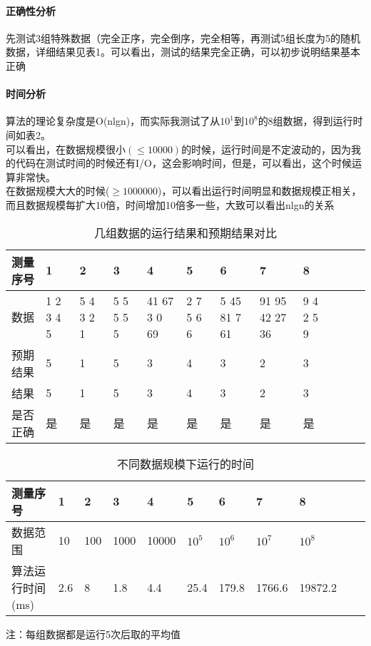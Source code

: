 \documentclass{article}
\begin{document}
\begin{CJK}{UTF8}{gkai}
\paragraph{正确性分析}
先测试3组特殊数据（完全正序，完全倒序，完全相等，再测试5组长度为5的随机数据，详细结果见表1。可以看出，测试的结果完全正确，可以初步说明结果基本正确\\
\paragraph{时间分析}
算法的理论复杂度是O(nlgn)，而实际我测试了从$10^{1}$到$10^{8}$的8组数据，得到运行时间如表2。\\
可以看出，在数据规模很小$(\leq10000)$的时候，运行时间是不定波动的，因为我的代码在测试时间的时候还有I/O，这会影响时间，但是，可以看出，这个时候运算非常快。\\
在数据规模大大的时候($\geq1000000$)，可以看出运行时间明显和数据规模正相关，而且数据规模每扩大10倍，时间增加10倍多一些，大致可以看出nlgn的关系\\
\begin{table}[!htbp] 
	\small
	\caption{几组数据的运行结果和预期结果对比}
	\begin{flushleft} 
		\begin{tabular}{|l|l|l|l|l|l|l|l|l|l|l|l|} 
			\hline 测量序号 & 1 & 2 & 3 & 4 & 5 & 6 & 7 & 8  \\ 
			\hline 数据 &1 2 3 4 5&5 4 3 2 1&5 5 5 5 5&41 67 3 0 69&2 7 5 6 6&5 45 81 7 61&91 95 42 27 36&9 4 2 5 9 \\ 
			\hline 预期结果
			&5&1&5&3&4&3&2&3  \\
			\hline 结果 
			&5&1&5&3&4&3&2&3  \\ 
			\hline 是否正确
			&是&是&是&是&是&是&是&是  \\ 
			\hline
		\end{tabular} 

	\end{flushleft} 
\end{table}

\begin{table}[!htbp] 
	
	\caption{不同数据规模下运行的时间}
	\begin{flushleft} 
		\begin{tabular}{|l|l|l|l|l|l|l|l|l|l|l|} 
			\hline 测量序号 & 1 & 2 & 3 & 4 & 5 & 6 & 7 & 8 \\ 
			\hline 数据范围 &10&100&1000&10000&$10^{5}$&$10^{6}$&$10^7$&$10^{8}$ \\ 
			\hline 算法运行时间 (ms)
			&2.6&8&1.8&4.4&25.4&179.8&1766.6&19872.2  \\
			\hline
		\end{tabular} 
		注：每组数据都是运行5次后取的平均值
	\end{flushleft} 
\end{table}



\end{CJK}
\end{document}
